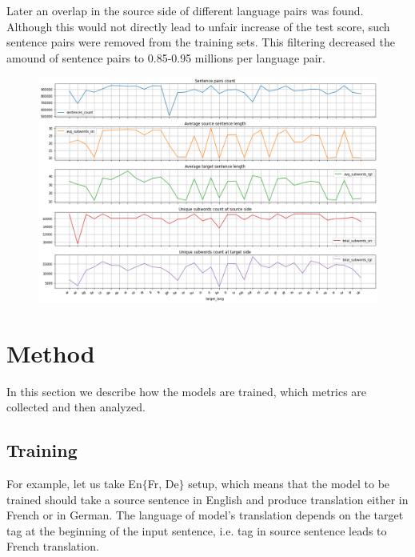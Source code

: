 Later an overlap in the source side of different language pairs was found.
Although this would not directly lead to unfair increase of the test score,
such sentence pairs were removed from the training sets.
This filtering decreased the amound of sentence pairs
to 0.85-0.95 millions per language pair.

\begin{figure}[h]
	\centering
	\includegraphics[width=0.9\columnwidth]{../img/train_set_statistics.png}
	\label{fig:language_statistics}
\end{figure}


\section{Method}
\label{section:method}

In this section we describe how the models are trained, which metrics
are collected and then analyzed.

\subsection{Training}

For example, let us take En\to{}$\{$Fr, De$\}$ setup, which means that
the model to be trained should take a source sentence in English and
produce translation either in French or in German.
The language of model's translation depends on the target tag at the beginning
of the input sentence, i.e.  tag in source sentence leads to French
translation.

